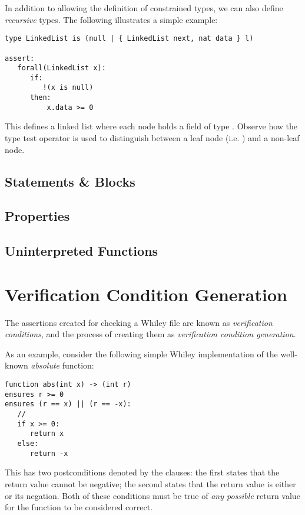 In addition to allowing the definition of constrained types, we can
also define {\em recursive} types.  The following illustrates a simple
example:

\begin{lstlisting}[language=WyAL]
type LinkedList is (null | { LinkedList next, nat data } l)

assert:
   forall(LinkedList x):
      if:
         !(x is null)
      then:
          x.data >= 0
\end{lstlisting}
This defines a linked list where each node holds a field
 of type .  Observe how the type test
operator is used to distinguish between a leaf node
(i.e. ) and a non-leaf node.

\subsection{Statements \& Blocks}


\subsection{Properties}

\subsection{Uninterpreted Functions}

\section{Verification Condition Generation}

The assertions created for checking a Whiley file are known as {\em
  verification conditions}, and the process of creating them as {\em
  verification condition generation}.

As an example, consider the following simple Whiley implementation of
the well-known {\em absolute} function:

\begin{lstlisting}[language=Whiley]
function abs(int x) -> (int r)
ensures r >= 0
ensures (r == x) || (r == -x):
   //
   if x >= 0:
      return x
   else:
      return -x
\end{lstlisting}


This has two postconditions denoted by the 
clauses: the first states that the return value cannot be negative;
the second states that the return value is either  or its
negation.  Both of these conditions must be true of {\em any possible}
return value for the function to be considered correct.

